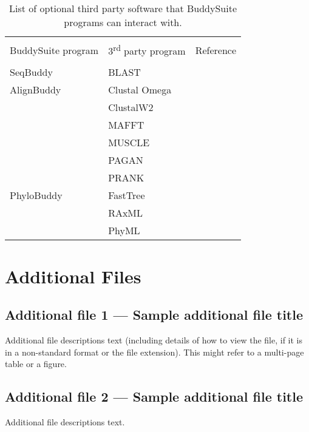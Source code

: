 \documentclass[twocolumn]{bmcart}%
\begin{document}
\begin{backmatter}
\begin{table}[h!]
\caption{List of optional third party software that BuddySuite programs can interact with.}
      \begin{tabular}{lll}
        \hline \\
	   BuddySuite program	&3\textsuperscript{rd} party program	& Reference  \\ \\
        \hline
        SeqBuddy		& BLAST 			& \cite{Camacho2009} \\
        \hline
        AlignBuddy	& Clustal Omega 	& \cite{Sievers:2011fn} \\
        					& ClustalW2 		& \cite{Larkin:2007hz} \\
						& MAFFT 			& \cite{Katoh:2013hm} \\
						& MUSCLE 			& \cite{Edgar:2004bo} \\
						& PAGAN 			& \cite{Loytynoja:2012fy} \\
        					& PRANK 			& \cite{Loytynoja:2005cb} \\				
        \hline
        PhyloBuddy	& FastTree 			& \cite{Price:2010eg} \\
        					& RAxML 			& \cite{Stamatakis:2006de} \\
        					& PhyML 			& \cite{Guindon:2010gf} \\
        \hline
      \end{tabular}
\end{table}


\section*{Additional Files}
  \subsection*{Additional file 1 --- Sample additional file title}
    Additional file descriptions text (including details of how to
    view the file, if it is in a non-standard format or the file extension).  This might
    refer to a multi-page table or a figure.

  \subsection*{Additional file 2 --- Sample additional file title}
    Additional file descriptions text.


\end{backmatter}
\end{document}
